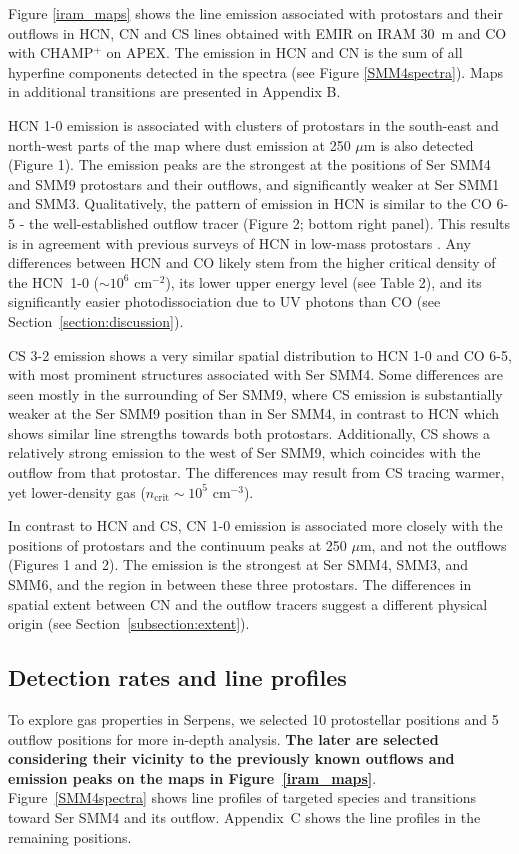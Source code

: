 \documentclass{aa}
\begin{document}
Figure \ref{iram_maps} shows the line emission associated with protostars and their outflows in HCN, CN and CS lines obtained with EMIR on IRAM 30~m and CO with CHAMP$^+$ on APEX. 
The emission in HCN and CN is the sum of all hyperfine components detected in the spectra 
(see Figure \ref{SMM4spectra}). Maps in additional transitions are presented in Appendix B.

HCN 1-0 emission is associated with clusters of protostars 
in the south-east and north-west parts of the map where dust emission at 250 $\mu$m is also detected (Figure 1). 
The emission peaks are the strongest at the positions of Ser SMM4 and SMM9 protostars and their outflows,
and significantly weaker at Ser SMM1 and SMM3. Qualitatively, the pattern of emission in
HCN is similar to the CO 6-5 - the well-established outflow tracer (Figure 2; bottom right panel). 
This results is in agreement with previous surveys of HCN in low-mass protostars \citep{Bac01,Wal14}.
Any differences between HCN and CO likely stem from the higher critical density of the 
\mbox{HCN 1-0} ($\sim$$10^6$ cm$^{-2}$), its lower upper energy level (see Table 2), and its 
significantly easier photodissociation due to UV photons than CO (see Section~\ref{section:discussion}). 

CS 3-2 emission shows a very similar spatial distribution to HCN 1-0 and CO 6-5, with most 
prominent structures associated with Ser SMM4. Some differences are seen mostly in the 
surrounding of Ser SMM9, where CS emission is substantially weaker at the Ser SMM9 position 
than in Ser SMM4, in contrast to HCN which shows similar line strengths towards both protostars. 
Additionally, CS shows a relatively strong emission to the west of Ser SMM9, which coincides 
with the outflow from that protostar. The differences may result from CS tracing warmer, yet lower-density gas ($n_\mathrm{crit}\sim$$10^5$ cm$^{-3}$).

In contrast to HCN and CS, CN 1-0 emission is associated more closely with the positions of protostars
and the continuum peaks at 250 $\mu$m, and not the outflows (Figures 1 and 2). The emission is the strongest at
Ser SMM4, SMM3, and SMM6, and the region in between these three protostars. The differences in 
spatial extent between CN and the outflow tracers suggest a different physical origin (see Section~\ref{subsection:extent}).

\subsection{Detection rates and line profiles}
\label{subsection:lines}
To explore gas properties in Serpens, we selected 10 protostellar positions and 5 
outflow positions for more in-depth analysis. \textbf{The later are selected considering their vicinity to the previously known outflows and emission peaks on the maps in Figure~\ref{iram_maps}}. Figure~\ref{SMM4spectra} shows 
line profiles of targeted species and transitions toward Ser SMM4 and its outflow. Appendix~C shows the line profiles in the remaining positions. 
\end{document}
